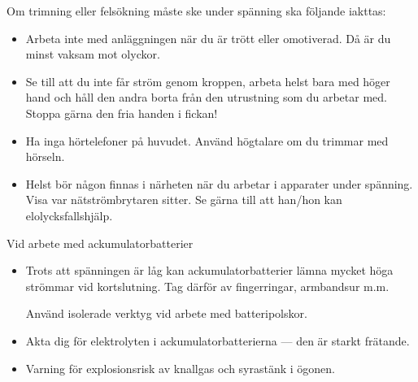 Om trimning eller felsökning måste ske under spänning ska följande iakttas:
\begin{itemize}
\item Arbeta inte med anläggningen när du är trött eller
  omotiverad. Då är du minst vaksam mot olyckor.
\item Se till att du inte får ström genom kroppen, arbeta helst bara med
  höger hand och håll den andra borta från den utrustning som du
  arbetar med. Stoppa gärna den fria handen i fickan!
\item Ha inga hörtelefoner på huvudet. Använd högtalare om du trimmar
  med hörseln.
\item Helst bör någon finnas i närheten när du arbetar i apparater
  under spänning. Visa var nätströmbrytaren sitter. Se gärna till att
  han/hon kan elolycksfallshjälp.
\end{itemize}

Vid arbete med ackumulatorbatterier
\begin{itemize}
\item Trots att spänningen är låg kan ackumulatorbatterier lämna
  mycket höga strömmar vid kortslutning. Tag därför av fingerringar,
  armbandsur m.m.

Använd isolerade verktyg vid arbete med batteripolskor.
\item Akta dig för elektrolyten i ackumulatorbatterierna --- den är
  starkt frätande.
\item Varning för explosionsrisk av knallgas och syrastänk i ögonen.

\end{itemize}
